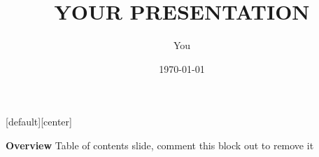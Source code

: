 \documentclass{beamer}
\title[Your Short Title]{\textbf{YOUR PRESENTATION}} %
\author{You} %
\institute[University at Buffalo] %
{
\textcolor{white}{\textit{username@buffalo.edu}} %
}
\date{\today} %
\begin{document}
{

\begin{frame}[plain]
    \titlepage
\end{frame}
  }

[default][center]%

\begin{frame}{\textbf{Overview}}
\vspace{3.5mm}
Table of contents slide, comment this block out to remove it
\tableofcontents %
\end{frame}
\end{document}
